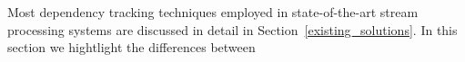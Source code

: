 \label {fs-acker-related}

Most dependency tracking techniques employed in state-of-the-art stream processing systems are discussed in detail in Section~\ref{existing_solutions}. In this section we hightlight the differences between 


